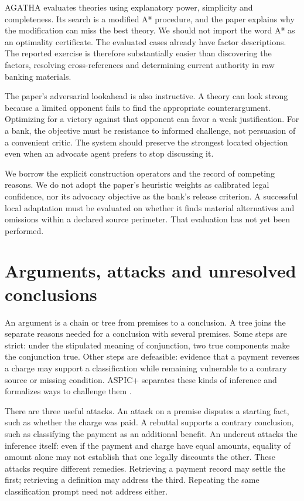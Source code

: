 \documentclass[12pt,a4paper,oneside,openany]{book}
\begin{document}
AGATHA evaluates theories using explanatory power, simplicity and completeness.
Its search is a modified A* procedure, and the paper explains why the modification
can miss the best theory. We should not import the word A* as an optimality
certificate. The evaluated cases already have factor descriptions. The reported
exercise is therefore substantially easier than discovering the factors,
resolving cross-references and determining current authority in raw banking
materials.

The paper's adversarial lookahead is also instructive. A theory can look strong
because a limited opponent fails to find the appropriate counterargument.
Optimizing for a victory against that opponent can favor a weak justification.
For a bank, the objective must be resistance to informed challenge, not persuasion
of a convenient critic. The system should preserve the strongest located
objection even when an advocate agent prefers to stop discussing it.

We borrow the explicit construction operators and the record of competing
reasons. We do not adopt the paper's heuristic weights as calibrated legal
confidence, nor its advocacy objective as the bank's release criterion. A
successful local adaptation must be evaluated on whether it finds material
alternatives and omissions within a declared source perimeter. That evaluation
has not yet been performed.

\section{Arguments, attacks and unresolved conclusions}
\label{merge:M05:04}


An argument is a chain or tree from premises to a conclusion. A tree joins
the separate reasons needed for a conclusion with several premises. Some steps are strict:
under the stipulated meaning of conjunction, two true components make the
conjunction true. Other steps are defeasible: evidence that a payment reverses a
charge may support a classification while remaining vulnerable to a contrary
source or missing condition. ASPIC+ separates these kinds of inference and
formalizes ways to challenge them \citep[sections 2--3]{aspic2010}.

There are three useful attacks. An attack on a premise disputes a starting fact,
such as whether the charge was paid. A rebuttal supports a contrary conclusion,
such as classifying the payment as an additional benefit. An undercut attacks the
inference itself: even if the payment and charge have equal amounts, equality of
amount alone may not establish that one legally discounts the other. These
attacks require different remedies. Retrieving a payment record may settle the
first; retrieving a definition may address the third. Repeating the same
classification prompt need not address either.
\end{document}
